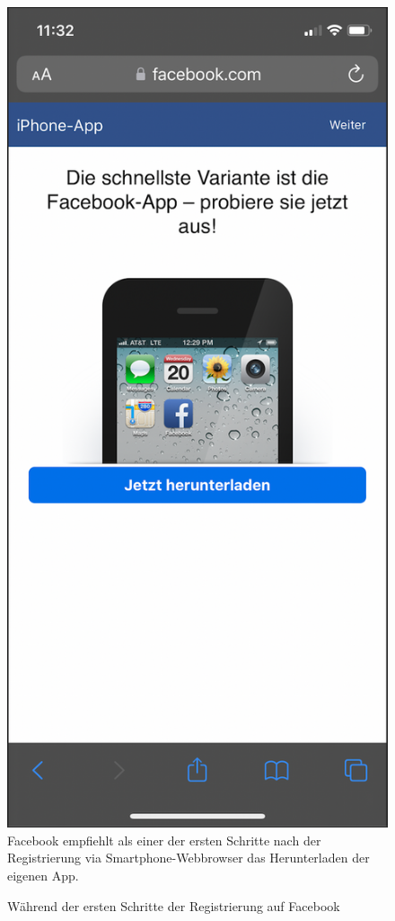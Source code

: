 \documentclass[a4paper]{scrartcl}
\begin{document}
\begin{figure}[H]
	\centering
	\caption{Während der ersten Schritte der Registrierung auf Facebook}
	\includegraphics[scale=0.3]{_assets/facebook_native_app2.png} \\
	Facebook empfiehlt als einer der ersten Schritte nach der Registrierung via Smartphone-Webbrowser das Herunterladen der eigenen App.
\end{figure}
\end{document}
